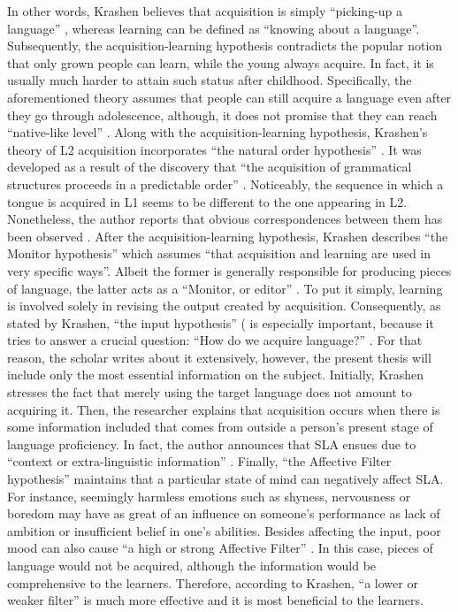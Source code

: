 \documentclass{article}
\begin{document}
	In other words, Krashen believes that acquisition is simply “picking-up a language” \cite{krashen_principles_1982}, whereas learning can be defined as “knowing about a language”. Subsequently, the acquisition-learning hypothesis contradicts the popular notion that only grown people can learn, while the young always acquire. In fact, it is usually much harder to attain such status after childhood. Specifically, the aforementioned theory assumes that people can still acquire a language even after they go through adolescence, although, it does not promise that they can reach “native-like level” \cite{krashen_principles_1982}. 
Along with the acquisition-learning hypothesis, Krashen’s theory of L2 acquisition incorporates “the natural order hypothesis” \cite{krashen_principles_1982}. It was developed as a result of the discovery that “the acquisition of grammatical structures proceeds in a predictable order” \cite{krashen_principles_1982}. Noticeably, the sequence in which a tongue is acquired in L1 seems to be different to the one appearing in L2. Nonetheless, the author reports that obvious correspondences between them has been observed \cite{krashen_principles_1982}.
After the acquisition-learning hypothesis, Krashen describes “the Monitor hypothesis” \cite{krashen_principles_1982} which assumes “that acquisition and learning are used in very specific ways”. Albeit the former is generally responsible for producing pieces of language, the latter acts as a “Monitor, or editor” \cite{krashen_principles_1982}. To put it simply, learning is involved solely in revising the output created by acquisition.
Consequently, as stated by Krashen, “the input hypothesis” (\cite{krashen_principles_1982} is especially important, because it tries to answer a crucial question: “How do we acquire language?” \cite{krashen_principles_1982}. For that reason, the scholar writes about it extensively, however, the present thesis will include only the most essential information on the subject. Initially, Krashen stresses the fact that merely using the target language does not amount to acquiring it. Then, the researcher explains that acquisition occurs when there is some information included that comes from outside a person’s present stage of language proficiency. In fact, the author announces that SLA ensues due to “context or extra-linguistic information” \cite{krashen_principles_1982}.
Finally, “the Affective Filter hypothesis” \cite{krashen_principles_1982} maintains that a particular state of mind can negatively affect SLA. For instance, seemingly harmless emotions such as shyness, nervousness or boredom may have as great of an influence on someone’s performance as lack of ambition or insufficient belief in one’s abilities. Besides affecting the input, poor mood can also cause “a high or strong Affective Filter” \cite{krashen_principles_1982}. In this case, pieces of language would not be acquired, although the information would be comprehensive to the learners. Therefore, according to Krashen, “a lower or weaker filter” \cite{krashen_principles_1982} is much more effective and it is most beneficial to the learners. 
\end{document}
